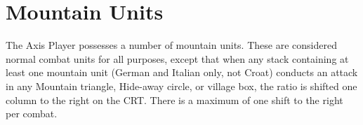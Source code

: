 \section{Mountain Units}\label{sec:12.0}


\begin{generalrule}
The Axis Player possesses a number of mountain units. These are considered normal combat units for all purposes, except that when any stack containing at least one mountain unit (German and Italian only, not Croat) conducts an attack in any Mountain triangle, Hide-away circle, or village box, the ratio is shifted one column to the right on the CRT. There is a maximum of one shift to the right per combat.
\end{generalrule}

